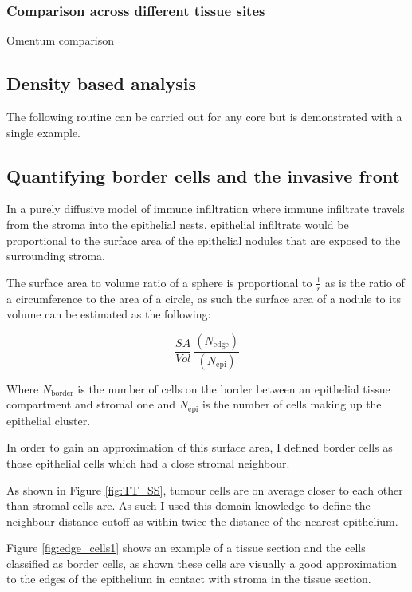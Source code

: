 \subsubsection{Comparison across different tissue sites}

Omentum comparison

\subsection{Density based analysis}
The following routine can be carried out for any core but is demonstrated with a single example.



\subsection{Quantifying border cells and the invasive front}

In a purely diffusive model of immune infiltration where immune infiltrate travels from the stroma into the epithelial nests, epithelial infiltrate would be proportional to the surface area of the epithelial nodules that are exposed to the surrounding stroma. 

 The surface area to volume ratio of a sphere is proportional to $\frac{1}{r}$ as is the ratio of a circumference to the area of a circle, as such the surface area of a nodule to its volume can be estimated as the following:

\[\frac{SA}{Vol} ~ \frac{(N_{\mathrm{edge}})} {(N_{\mathrm{epi}})}\]

Where $N_{\mathrm{border}}$ is the number of cells on the border between an epithelial tissue compartment and stromal one and $N_{\mathrm{epi}}$ is the number of cells making up the epithelial cluster.

In order to gain an approximation of this surface area, I defined border cells as those epithelial cells which had a close stromal neighbour.

As shown in Figure \ref{fig:TT_SS}, tumour cells are on average closer to each other than stromal cells are. As such I used this domain knowledge to define the neighbour distance cutoff as within twice the distance of the nearest epithelium.

Figure \ref{fig:edge_cells1} shows an example of a tissue section and the cells classified as border cells, as shown these cells are visually a good approximation to the edges of the epithelium in contact with stroma in the tissue section.

